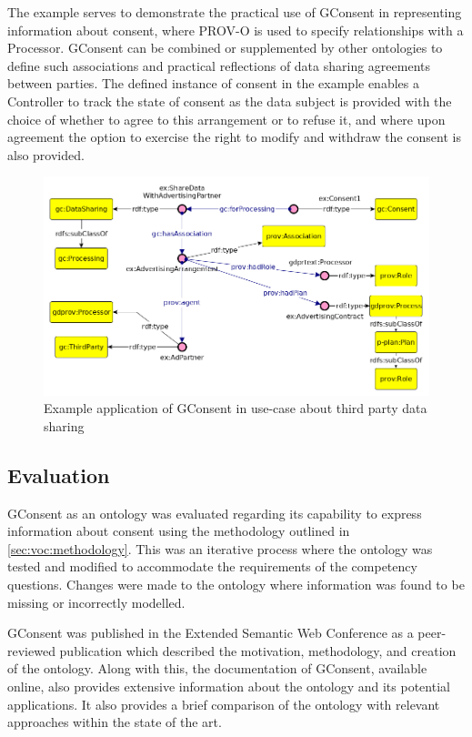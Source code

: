 The example serves to demonstrate the practical use of GConsent in representing information about consent, where PROV-O is used to specify relationships with a Processor. GConsent can be combined or supplemented by other ontologies to define such associations and practical reflections of data sharing agreements between parties. The defined instance of consent in the example enables a Controller to track the state of consent as the data subject is provided with the choice of whether to agree to this arrangement or to refuse it, and where upon agreement the option to exercise the right to modify and withdraw the consent is also provided.
\begin{figure}[htbp]
    \centering
    \includegraphics[width=0.8\linewidth]{img/gconsent_third_party_datasharing.png}
    \caption{Example application of GConsent in use-case about third party data sharing \cite{}}
    \label{fig:vocabs:gconsent-example}
\end{figure}

\subsection{Evaluation}
GConsent as an ontology was evaluated regarding its capability to express information about consent using the methodology outlined in \autoref{sec:voc:methodology}.
This was an iterative process where the ontology was tested and modified to accommodate the requirements of the competency questions. Changes were made to the ontology where information was found to be missing or incorrectly modelled.

GConsent was published in the Extended Semantic Web Conference as a peer-reviewed publication \cite{} which described the motivation, methodology, and creation of the ontology. Along with this, the documentation of GConsent, available online, also provides extensive information about the ontology and its potential applications. It also provides a brief comparison of the ontology with relevant approaches within the state of the art.

